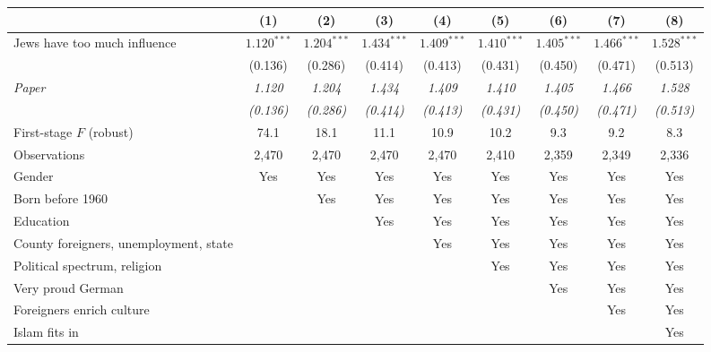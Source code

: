\begin{tabular}{lcccccccc}
\toprule
 & (1) & (2) & (3) & (4) & (5) & (6) & (7) & (8) \\
\midrule
Jews have too much influence & $1.120^{***}$ & $1.204^{***}$ & $1.434^{***}$ & $1.409^{***}$ & $1.410^{***}$ & $1.405^{***}$ & $1.466^{***}$ & $1.528^{***}$ \\
 & (0.136) & (0.286) & (0.414) & (0.413) & (0.431) & (0.450) & (0.471) & (0.513) \\
\textit{Paper} & \textit{1.120} & \textit{1.204} & \textit{1.434} & \textit{1.409} & \textit{1.410} & \textit{1.405} & \textit{1.466} & \textit{1.528} \\
 & \textit{(0.136)} & \textit{(0.286)} & \textit{(0.414)} & \textit{(0.413)} & \textit{(0.431)} & \textit{(0.450)} & \textit{(0.471)} & \textit{(0.513)} \\
\midrule
First-stage $F$ (robust) & 74.1 & 18.1 & 11.1 & 10.9 & 10.2 & 9.3 & 9.2 & 8.3 \\
Observations & 2,470 & 2,470 & 2,470 & 2,470 & 2,410 & 2,359 & 2,349 & 2,336 \\
Gender & Yes & Yes & Yes & Yes & Yes & Yes & Yes & Yes \\
Born before 1960 &  & Yes & Yes & Yes & Yes & Yes & Yes & Yes \\
Education &  &  & Yes & Yes & Yes & Yes & Yes & Yes \\
County foreigners, unemployment, state &  &  &  & Yes & Yes & Yes & Yes & Yes \\
Political spectrum, religion &  &  &  &  & Yes & Yes & Yes & Yes \\
Very proud German &  &  &  &  &  & Yes & Yes & Yes \\
Foreigners enrich culture &  &  &  &  &  &  & Yes & Yes \\
Islam fits in &  &  &  &  &  &  &  & Yes \\
\bottomrule
\end{tabular}
